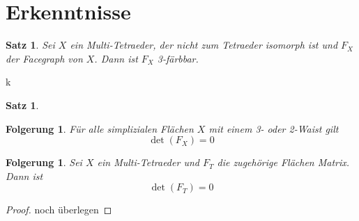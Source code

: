 \documentclass[12pt,titlepage,twoside,cleardoublepage]{article}
\theoremstyle{nummermitklammern}
\newtheorem{folgerung}[temp]{Folgerung}
\newtheorem{bemerkung}[temp]{Bemerkung}
\newtheorem{satz}[temp]{Satz}
\newtheorem{folgerung}[zahl]{Folgerung}
\newtheorem{bemerkung}[zahl]{Bemerkung}
\newtheorem{satz}[zahl]{Satz}
\numberwithin{equation}{section}
\begin{document}
\section{Erkenntnisse}
\begin{comment}
\begin{satz}
Sei $(X,<)$ eine vertex-treue  Sphäre und $e\in X_1$ eine Kante, die folgendes erfüllt 
\[
deg(V)=4 \forall V\in X_0(X_2(e)).
\]
 Dann ist $X \cong O$, wobei $(O,<_O)$ der bereits bekannte Oktaeder ist. 
\end{satz}
\begin{proof}
Für den Beweis nutzen wir die zuvor definierte Butterfly Deletion. Sei $X$ eine vertex-treue Sphäre mit obiger Eigenschaft. Dann bildet $Y=\textcolor{red}{e\beta(X)}$ eine simpliziale Fläche mit den Knoten $V,V',V''$ und Kanten $e',e''$, wobei
\begin{align*}
&deg(V)=4\\
&deg(V')=deg(V'')=3\\
&X_0(e')=\{V,V'\}\\
&X_0(e')=\{V,V''\}
\end{align*}
gilt.  Ein erneutes Anwenden der Butterfly Deletion liefert und die Sphäre $Z=\textcolor{red}{e\beta(Y)}$ mit $\bar{V}\in Z_0$ und $\bar{e}\in Z_1$, die $X_0(\bar{e})=\{\bar{V},V''\}$ erfüllen. Damit ist $Z\cong T$, da $\bar{V}$ und $V''$ benachbarte Knoten vom Grad $3$ sind.
Damit ist $Y$ isomorph zum Double-Tetraeder $DT$ und schlussendlich erhält man die obige Behauptung.
\end{proof}
\begin{bemerkung}
Falls bei der obigen Formulierung des Satzes auf die Voraussetzung der Vertex-Treue verzichtet wird, so ist die Aussage falsch. Denn die simpliziale Fläche, die dadurch entsteht, dass man sich eine beliebige Kante des Oktaeders nimmt, einen Cratercut an dieser durchführt und an den neu entstandenen Randkanten einen Open-Bag anheftet, erfüllt dann die Voraussetzung der schwächeren Umformulierung. Diese ist jedoch nicht zum Oktaeder isomorph.
\end{bemerkung}
\end{comment}
\begin{satz}
Sei $X$ ein Multi-Tetraeder, der nicht zum Tetraeder isomorph ist und $F_X$ der Facegraph von $X$. Dann ist $F_X$ 3-färbbar.
\end{satz}
k

\begin{satz}
\end{satz}
\begin{folgerung}
Für alle simplizialen Flächen $X$ mit einem 3- oder 2-Waist gilt 
\[
\det(F_X)=0
\]
\end{folgerung}
\begin{folgerung}
Sei $X$ ein Multi-Tetraeder und $F_T$ die zugehörige Flächen Matrix. Dann ist 
\[
\det(F_T)=0
\]
\end{folgerung}
\begin{proof}
noch überlegen
\end{proof}
\end{document}
